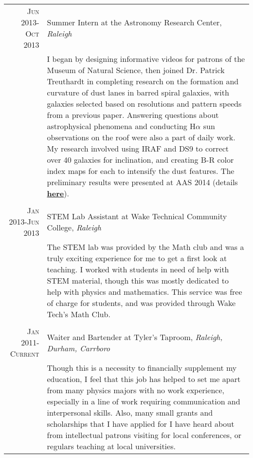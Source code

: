 \documentclass[a4paper,10pt]{article} %
\begin{document}
\begin{tabular}{r|p{11cm}}

\textsc{Jun 2013-Oct 2013} & Summer Intern at the Astronomy Research Center, \emph{Raleigh}\\
& \footnotesize{I began by designing informative videos for patrons of the Museum of Natural Science, then joined Dr. Patrick Treuthardt in completing research on the formation and curvature of dust lanes in barred spiral galaxies, with galaxies selected based on resolutions and pattern speeds from a previous paper. Answering questions about astrophysical phenomena and conducting H$\alpha$ sun observations on the roof were also a part of daily work. My research involved using IRAF and DS9 to correct over 40 galaxies for inclination, and creating B-R color index maps for each to intensify the dust features. The preliminary results were presented at AAS 2014 (details \textbf{\href{http://adsabs.harvard.edu/abs/2014AAS...22345312T}{here}}).}\\
\multicolumn{2}{c}{} \\


\textsc{Jan 2013-Jun 2013} & STEM Lab Assistant at Wake Technical Community College, \emph{Raleigh}\\
& \footnotesize{The STEM lab was provided by the Math club and was a truly exciting experience for me to get a first look at teaching. I worked with students in need of help with STEM material, though this was mostly dedicated to help with physics and mathematics. This service was free of charge for students, and was provided through Wake Tech's Math Club.}\\
\multicolumn{2}{c}{} \\


\textsc{Jan 2011-Current} & Waiter and Bartender at Tyler's Taproom, \emph{Raleigh, Durham, Carrboro}\\
& \footnotesize{Though this is a necessity to financially supplement my education, I feel that this job has helped to set me apart from many physics majors with no work experience, especially in a line of work requiring communication and interpersonal skills. Also, many small grants and scholarships that I have applied for I have heard about from intellectual patrons visiting for local conferences, or regulars teaching at local universities.}
\end{tabular}
\end{document}
